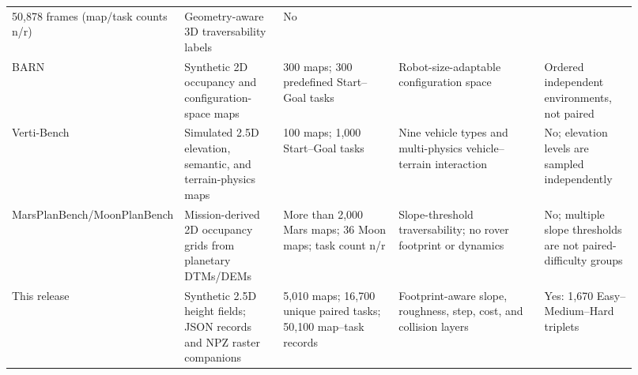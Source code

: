 \documentclass[11pt]{article}
\begin{document}
{\begin{longtable}{@{}L{0.18\linewidth} L{0.16\linewidth} L{0.19\linewidth}
                   L{0.24\linewidth} L{0.15\linewidth}@{}}
    50,878 frames (map/task counts n/r) & Geometry-aware 3D traversability labels & No \\
    BARN \cite{barn} & Synthetic 2D occupancy and configuration-space maps & 300
    maps; 300 predefined Start--Goal tasks & Robot-size-adaptable configuration
    space & Ordered independent environments, not paired \\
    Verti-Bench \cite{vertibench} & Simulated 2.5D elevation, semantic, and
    terrain-physics maps & 100 maps; 1,000 Start--Goal tasks & Nine vehicle types
    and multi-physics vehicle--terrain interaction & No; elevation levels are
    sampled independently \\
    MarsPlanBench/\newline MoonPlanBench \cite{planetarypathbench} & Mission-derived 2D occupancy
    grids from planetary DTMs/DEMs & More than 2,000 Mars maps; 36 Moon maps;
    task count n/r & Slope-threshold traversability; no rover footprint or
    dynamics & No; multiple slope thresholds are not paired-difficulty groups \\
    This release & Synthetic 2.5D height fields; JSON records and NPZ raster
    companions &
    5,010 maps; 16,700 unique paired tasks; 50,100 map--task records &
    Footprint-aware slope, roughness, step, cost, and collision layers & Yes:
    1,670 Easy--Medium--Hard triplets \\
  \end{longtable}
}
\end{document}
